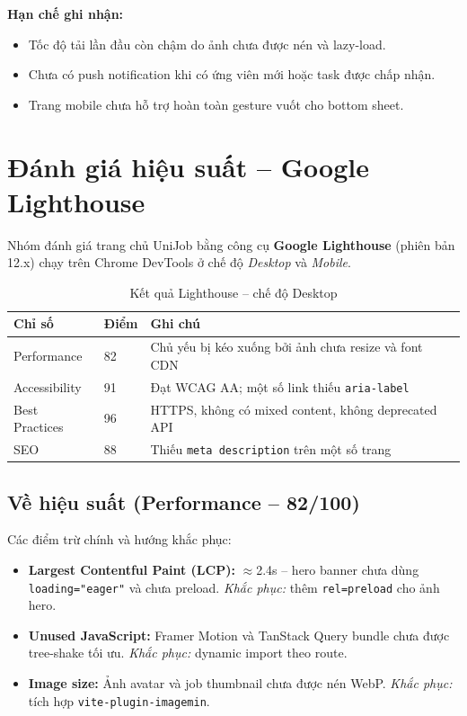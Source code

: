 \textbf{Hạn chế ghi nhận:}
\begin{itemize}
  \item Tốc độ tải lần đầu còn chậm do ảnh chưa được nén và lazy-load.
  \item Chưa có push notification khi có ứng viên mới hoặc task được chấp nhận.
  \item Trang mobile chưa hỗ trợ hoàn toàn gesture vuốt cho bottom sheet.
\end{itemize}

\section{Đánh giá hiệu suất -- Google Lighthouse}

Nhóm đánh giá trang chủ UniJob bằng công cụ \textbf{Google Lighthouse} (phiên bản 12.x)
chạy trên Chrome DevTools ở chế độ \textit{Desktop} và \textit{Mobile}.

\begin{table}[H]
\centering
\caption{Kết quả Lighthouse -- chế độ Desktop}
\renewcommand{\arraystretch}{1.2}
\begin{tabularx}{\textwidth}{|p{4.5cm}|p{2cm}|X|}
\hline
\rowcolor{emeraldrow}
\textbf{\color{emeraldhead}Chỉ số} &
\textbf{\color{emeraldhead}Điểm} &
\textbf{\color{emeraldhead}Ghi chú} \\
\hline
Performance       & 82 & Chủ yếu bị kéo xuống bởi ảnh chưa resize và font CDN \\
\hline
Accessibility     & 91 & Đạt WCAG AA; một số link thiếu \texttt{aria-label} \\
\hline
Best Practices    & 96 & HTTPS, không có mixed content, không deprecated API \\
\hline
SEO               & 88 & Thiếu \texttt{meta description} trên một số trang \\
\hline
\end{tabularx}
\end{table}

\subsection{Về hiệu suất (Performance -- 82/100)}

Các điểm trừ chính và hướng khắc phục:
\begin{itemize}
  \item \textbf{Largest Contentful Paint (LCP):} $\approx$2.4s -- hero banner chưa dùng
    \texttt{loading="eager"} và chưa preload. \textit{Khắc phục:} thêm \texttt{rel=preload}
    cho ảnh hero.
  \item \textbf{Unused JavaScript:} Framer Motion và TanStack Query bundle chưa được
    tree-shake tối ưu. \textit{Khắc phục:} dynamic import theo route.
  \item \textbf{Image size:} Ảnh avatar và job thumbnail chưa được nén WebP.
    \textit{Khắc phục:} tích hợp \texttt{vite-plugin-imagemin}.
\end{itemize}


